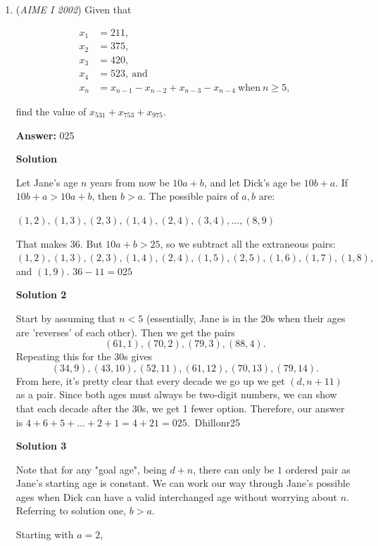 \begin{enumerate}
 


	\item (\textit{AIME I 2002}) Given that

 \begin{align*}x_{1}&=211,\\ x_{2}&=375,\\ x_{3}&=420,\\ x_{4}&=523,\ \text{and}\\ x_{n}&=x_{n-1}-x_{n-2}+x_{n-3}-x_{n-4}\ \text{when}\ n\geq5, \end{align*}

find the value of $x_{531}+x_{753}+x_{975}$.


 
 \textbf{Answer: }025



\textbf{Solution}

Let Jane's age $n$ years from now be $10a+b$, and let Dick's age be $10b+a$. If $10b+a>10a+b$, then $b>a$. The possible pairs of $a,b$ are:

 $(1,2), (1,3), (2,3), (1,4), (2,4), (3,4), \dots , (8,9)$

 That makes 36. But $10a+b>25$, so we subtract all the extraneous pairs: $(1,2), (1,3), (2,3), (1,4), (2,4), (1,5), (2,5), (1,6), (1,7), (1,8),$ and $(1,9)$. $36-11=\boxed{025}$




\textbf{Solution 2}

Start by assuming that $n < 5$ (essentially, Jane is in the 20s when their ages are 'reverses' of each other). Then we get the pairs 
 \[(61,1),(70,2),(79,3),(88,4).\] Repeating this for the 30s gives 
 \[(34,9),(43,10),(52,11),(61,12),(70,13),(79,14).\] From here, it's pretty clear that every decade we go up we get $(d,n+11)$ as a pair. Since both ages must always be two-digit numbers, we can show that each decade after the 30s, we get 1 fewer option. Therefore, our answer is $4+6+5+\dots+2+1=4+21=\boxed{025}.$~Dhillonr25

 



\textbf{Solution 3}

Note that for any "goal age", being $d + n$, there can only be $1$ ordered pair as Jane’s starting age is constant. We can work our way through Jane's possible ages when Dick can have a valid interchanged age without worrying about $n$. Referring to solution one, $b>a$.

 Starting with $a = 2$,

 



\end{enumerate}

